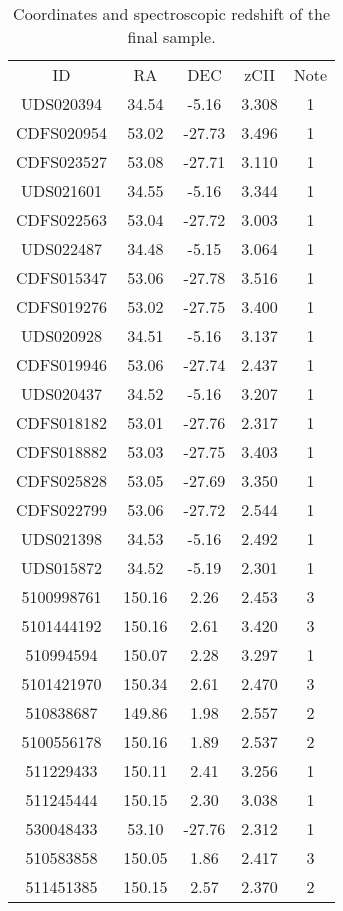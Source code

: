 \begin{table}
\caption{{Coordinates and spectroscopic redshift of the final sample.}}
\label{tab:coordinates}
    \centering    
    \begin{scriptsize}
    \begin{tabular}{|c|c|c|c|c|}\hline\hline
    ID&RA&DEC&zCII&Note\\
UDS020394 & 34.54 & -5.16 & 3.308 & 1 \\
CDFS020954 & 53.02 & -27.73 & 3.496 & 1 \\
CDFS023527 & 53.08 & -27.71 & 3.110 & 1 \\
UDS021601 & 34.55 & -5.16 & 3.344 & 1 \\
CDFS022563 & 53.04 & -27.72 & 3.003 & 1 \\
UDS022487 & 34.48 & -5.15 & 3.064 & 1 \\
CDFS015347 & 53.06 & -27.78 & 3.516 & 1 \\
CDFS019276 & 53.02 & -27.75 & 3.400 & 1 \\
UDS020928 & 34.51 & -5.16 & 3.137 & 1 \\
CDFS019946 & 53.06 & -27.74 & 2.437 & 1 \\
UDS020437 & 34.52 & -5.16 & 3.207 & 1 \\
CDFS018182 & 53.01 & -27.76 & 2.317 & 1 \\
CDFS018882 & 53.03 & -27.75 & 3.403 & 1 \\
CDFS025828 & 53.05 & -27.69 & 3.350 & 1 \\
CDFS022799 & 53.06 & -27.72 & 2.544 & 1 \\
UDS021398 & 34.53 & -5.16 & 2.492 & 1 \\
UDS015872 & 34.52 & -5.19 & 2.301 & 1 \\
5100998761 & 150.16 & 2.26 & 2.453 & 3 \\
5101444192 & 150.16 & 2.61 & 3.420 & 3 \\
510994594 & 150.07 & 2.28 & 3.297 & 1 \\
5101421970 & 150.34 & 2.61 & 2.470 & 3 \\
510838687 & 149.86 & 1.98 & 2.557 & 2 \\
5100556178 & 150.16 & 1.89 & 2.537 & 2 \\
511229433 & 150.11 & 2.41 & 3.256 & 1 \\
511245444 & 150.15 & 2.30 & 3.038 & 1 \\
530048433 & 53.10 & -27.76 & 2.312 & 1 \\
510583858 & 150.05 & 1.86 & 2.417 & 3 \\
511451385 & 150.15 & 2.57 & 2.370 & 2 \\

\end{tabular}
\end{scriptsize}
\end{table}

